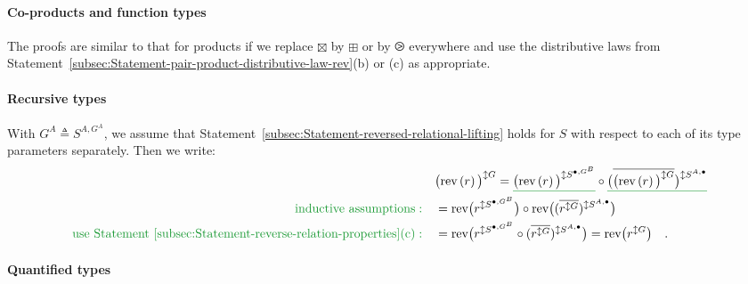 \paragraph{Co-products and function types}

The proofs are similar to that for products if we replace $\boxtimes$
by $\boxplus$ or by $\ogreaterthan$ everywhere and use the distributive
laws from Statement~\ref{subsec:Statement-pair-product-distributive-law-rev}(b)
or (c) as appropriate.

\paragraph{Recursive types}

With $G^{A}\triangleq S^{A,G^{A}}$, we assume that Statement~\ref{subsec:Statement-reversed-relational-lifting}
holds for $S$ with respect to each of its type parameters separately.
Then we write: 
\begin{align*}
 & \big(\text{rev}\left(r\right)\big)^{\updownarrow G}=\gunderline{\big(\text{rev}\left(r\right)\big)^{\updownarrow S^{\bullet,G^{B}}}}\circ\gunderline{\big(\overline{\big(\text{rev}\left(r\right)\big)^{\updownarrow G}}\big)^{\updownarrow S^{A,\bullet}}}\\
{\color{greenunder}\text{inductive assumptions}:}\quad & =\text{rev}\big(r^{\updownarrow S^{\bullet,G^{B}}}\big)\circ\text{rev}\big((\overline{r^{\updownarrow G}})^{\updownarrow S^{A,\bullet}}\big)\\
{\color{greenunder}\text{use Statement~\ref{subsec:Statement-reverse-relation-properties}(c)}:}\quad & =\text{rev}\big(r^{\updownarrow S^{\bullet,G^{B}}}\circ(\overline{r^{\updownarrow G}})^{\updownarrow S^{A,\bullet}}\big)=\text{rev}\big(r^{\updownarrow G}\big)\quad.
\end{align*}


\paragraph{Quantified types}

